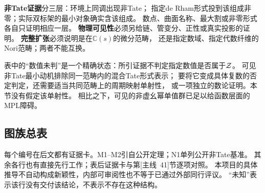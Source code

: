 \documentclass[11pt,a4paper]{ctexart}
\theoremstyle{cnplain}\newtheorem{theorem}{定理}[section]
\theoremstyle{definition}\newtheorem{definition}[theorem]{定义}
\theoremstyle{remark}\newtheorem{remark}[theorem]{注}
\begin{document}
\textbf{非Tate证据}分三层：环境上同调出现非Tate；
指定de Rham形式投到该组成非零；实际双标架的最小对象确实含该组成。
数点、曲面名称、最大割或非零形式各自只证明相应一层。
\textbf{物理可见性}必须另给链、管变分、正性或真实投影的证明。
\textbf{完整扩张}必须说明是在$\mathbb C(s)$的微分范畴，
还是指定数域、指定代数纤维的Nori范畴；两者不能互换。

表中的“数值未判”是一个精确状态：所引证据不判定指定数值是否属于$\cal Z$。
可见非Tate最小动机排除同一范畴内的混合Tate形式表示；
要将它变成具体复数的否定判定，还需要适当共同范畴上的周期映射单射性，
或一项独立的数论证明。本节没有假定该单射性。
相比之下，可见的非虚幺幂单值群已足以给函数层面的MPL障碍。

\subsection{图族总表}
\label{subsec:familytable}
每个编号在后文都有证据卡。M1--M2引自公开定理；N1单列公开非Tate基准。
其余各行也有直接先行工作；表后证据卡与第\textup{[主线~41]}节逐项对照。
本项目的具体推导不自动构成新颖性，内部可审阅性也不等于已通过外部同行评议。
“未知”表示该行没有交付该结论，不表示不存在这种结构。
\end{document}
